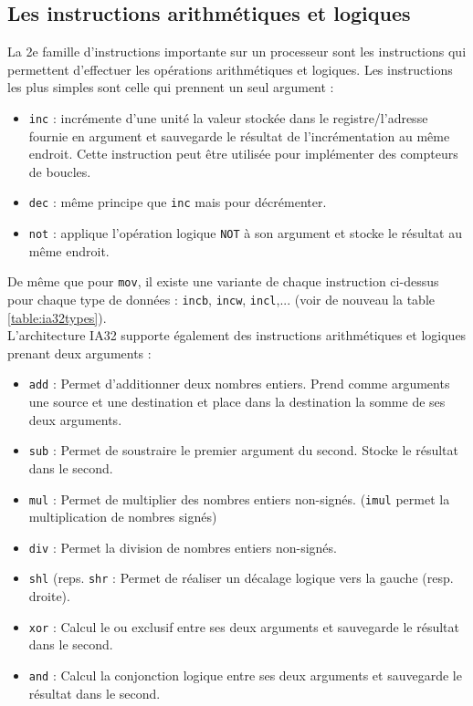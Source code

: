 \subsection{Les instructions arithmétiques et logiques}
La 2e famille d'instructions importante sur un processeur sont les instructions qui permettent d'effectuer les opérations arithmétiques et logiques.
Les instructions les plus simples sont celle qui prennent un seul argument :
\begin{itemize}
  \item \texttt{inc} : incrémente d'une unité la valeur stockée dans le registre/l'adresse fournie en argument et sauvegarde le résultat de l'incrémentation au même endroit.
    Cette instruction peut être utilisée pour implémenter des compteurs de boucles.
  \item \texttt{dec} : même principe que \texttt{inc} mais pour décrémenter.
  \item \texttt{not} : applique l'opération logique \texttt{NOT} à son argument et stocke le résultat au même endroit.
\end{itemize}
De même que pour \texttt{mov}, il existe une variante de chaque instruction ci-dessus pour chaque type de données : \texttt{incb}, \texttt{incw}, \texttt{incl},...
(voir de nouveau la table \ref{table:ia32types}).\\

L'architecture IA32 supporte également des instructions arithmétiques et logiques prenant deux arguments :
\begin{itemize}
  \item \texttt{add} : Permet d'additionner deux nombres entiers.
    Prend comme arguments une source et une destination et place dans la destination la somme de ses deux arguments.
  \item \texttt{sub} : Permet de soustraire le premier argument du second.
    Stocke le résultat dans le second.
  \item \texttt{mul} : Permet de multiplier des nombres entiers non-signés.
    (\texttt{imul} permet la multiplication de nombres signés)
  \item \texttt{div} : Permet la division de nombres entiers non-signés.
  \item \texttt{shl} (reps. \texttt{shr} : Permet de réaliser un décalage logique vers la gauche (resp. droite).
  \item \texttt{xor} : Calcul le ou exclusif entre ses deux arguments et sauvegarde le résultat dans le second.
  \item \texttt{and} : Calcul la conjonction logique entre ses deux arguments et sauvegarde le résultat dans le second.
\end{itemize}


